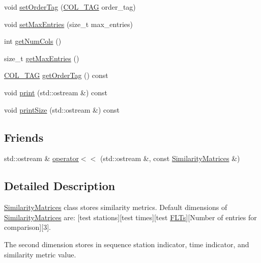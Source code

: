 \begin{DoxyCompactItemize}
void \mbox{\hyperlink{class_similarity_matrices_a622de4627aa3f6ac6dab361127a5c365}{set\+Order\+Tag}} (\mbox{\hyperlink{class_similarity_matrices_a8fea56a2e7c8a9f692753c8f706e5706}{C\+O\+L\+\_\+\+T\+AG}} order\+\_\+tag)
\item 
void \mbox{\hyperlink{class_similarity_matrices_a1032538b8ffafc174d1aca5826bb22d7}{set\+Max\+Entries}} (size\+\_\+t max\+\_\+entries)
\item 
int \mbox{\hyperlink{class_similarity_matrices_aabe756a1a4533fcdab2789e3f76d01fb}{get\+Num\+Cols}} ()
\item 
size\+\_\+t \mbox{\hyperlink{class_similarity_matrices_aba02a408e5feec58c989d3b85b818816}{get\+Max\+Entries}} ()
\item 
\mbox{\hyperlink{class_similarity_matrices_a8fea56a2e7c8a9f692753c8f706e5706}{C\+O\+L\+\_\+\+T\+AG}} \mbox{\hyperlink{class_similarity_matrices_a673acefe44dc23a09fa99f9506766511}{get\+Order\+Tag}} () const
\item 
void \mbox{\hyperlink{class_similarity_matrices_a4c179c4c5ea3bb2f187ea5e26b4b853b}{print}} (std\+::ostream \&) const
\item 
void \mbox{\hyperlink{class_similarity_matrices_a7ab85a46c3d93d519b6ea89a4856938a}{print\+Size}} (std\+::ostream \&) const
\end{DoxyCompactItemize}
\subsection*{Friends}
\begin{DoxyCompactItemize}
\item 
std\+::ostream \& \mbox{\hyperlink{class_similarity_matrices_af149863a23588d5fe79dacef6d1a5edd}{operator$<$$<$}} (std\+::ostream \&, const \mbox{\hyperlink{class_similarity_matrices}{Similarity\+Matrices}} \&)
\end{DoxyCompactItemize}


\subsection{Detailed Description}
\mbox{\hyperlink{class_similarity_matrices}{Similarity\+Matrices}} class stores similarity metrics. Default dimensions of \mbox{\hyperlink{class_similarity_matrices}{Similarity\+Matrices}} are\+: \mbox{[}test stations\mbox{]}\mbox{[}test times\mbox{]}\mbox{[}test \mbox{\hyperlink{class_f_l_ts}{F\+L\+Ts}}\mbox{]}\mbox{[}Number of entries for comparison\mbox{]}\mbox{[}3\mbox{]}. 

The second dimension stores in sequence station indicator, time indicator, and similarity metric value. 

